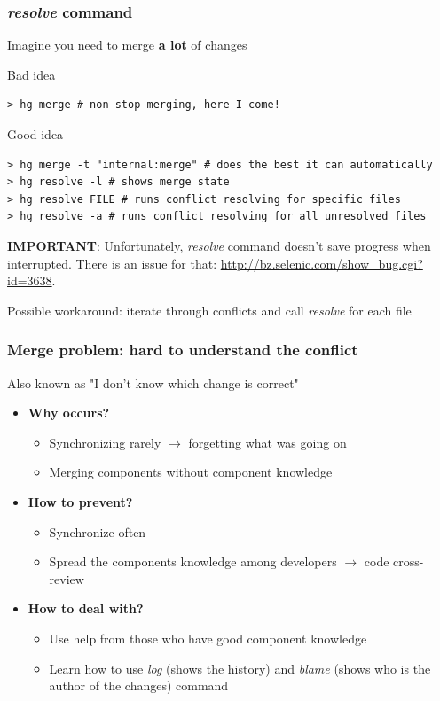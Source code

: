 \documentclass{beamer}
\begin{document}
\begin{frame}[fragile]
\frametitle{\textit{resolve} command}
Imagine you need to merge \textbf{a lot} of changes

\begin{exampleblock}{Bad idea}
\begin{verbatim}
> hg merge # non-stop merging, here I come!
\end{verbatim}
\end{exampleblock}

\begin{exampleblock}{Good idea}
\begin{Verbatim}[fontsize=\footnotesize]
> hg merge -t "internal:merge" # does the best it can automatically
> hg resolve -l # shows merge state
> hg resolve FILE # runs conflict resolving for specific files
> hg resolve -a # runs conflict resolving for all unresolved files
\end{Verbatim}
\end{exampleblock}
\textbf{IMPORTANT}: Unfortunately, \textit{resolve} command doesn't save progress when interrupted. There is an issue for that: \url{http://bz.selenic.com/show_bug.cgi?id=3638}. 

Possible workaround: iterate through conflicts and call \textit{resolve} for each file
\end{frame}

\begin{frame}
\frametitle{Merge problem: hard to understand the conflict}
Also known as "I don't know which change is correct"


\begin{itemize}
\item \textbf{Why occurs?}
\begin{itemize}
\item Synchronizing rarely $\to$ forgetting what was going on
\item Merging components without component knowledge
\end{itemize}
\item \textbf{How to prevent?}
\begin{itemize}
\item Synchronize often
\item Spread the components knowledge among developers $\to$ code cross-review
\end{itemize}
\item \textbf{How to deal with?}
\begin{itemize}
\item Use help from those who have good component knowledge
\item Learn how to use \textit{log} (shows the history) and \textit{blame} (shows who is the author of the changes) command
\end{itemize}
\end{itemize}
\end{frame}
\end{document}
